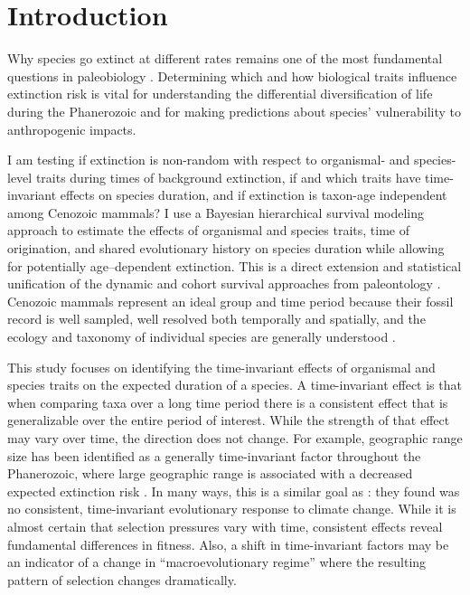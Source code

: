 \documentclass[12pt,letterpaper]{article}
\begin{document}
\section{Introduction}

Why species go extinct at different rates remains one of the most fundamental questions in paleobiology \citep{Simpson1944,VanValen1973,Raup1991b,Raup1994,Quental2013,Wagner2014b,Jablonski2005,Payne2007,Kitchell1986}. Determining which and how biological traits influence extinction risk is vital for understanding the differential diversification of life during the Phanerozoic and for making predictions about species' vulnerability to anthropogenic impacts. 

I am testing if extinction is non-random with respect to organismal- and species-level traits during times of background extinction, if and which traits have time-invariant effects on species duration, and if extinction is taxon-age independent among Cenozoic mammals? I use a Bayesian hierarchical survival modeling approach to estimate the effects of organismal and species traits, time of origination, and shared evolutionary history on species duration while allowing for potentially age--dependent extinction. This is a direct extension and statistical unification of the dynamic and cohort survival approaches from paleontology \citep{Simpson1944,VanValen1973,Foote1988,Raup1978,Raup1975,VanValen1979,Baumiller1993,Sepkoski1975}. Cenozoic mammals represent an ideal group and time period because their fossil record is well sampled, well resolved both temporally and spatially, and the ecology and taxonomy of individual species are generally understood \citep{Alroy2009,Alroy2000g,Jernvall2002,Liow2008,Smith2004,Quental2013,Alroy1996a,Alroy1998,Simpson1944,Blois2009,Tomiya2013,Marcot2014}. 

This study focuses on identifying the time-invariant effects of organismal and species traits on the expected duration of a species. A time-invariant effect is that when comparing taxa over a long time period there is a consistent effect that is generalizable over the entire period of interest. While the strength of that effect may vary over time, the direction does not change. For example, geographic range size has been identified as a generally time-invariant factor throughout the Phanerozoic, where large geographic range is associated with a decreased expected extinction risk \citep{Payne2007}. In many ways, this is a similar goal as \citet{Alroy2000g}: they found was no consistent, time-invariant evolutionary response to climate change. While it is almost certain that selection pressures vary with time, consistent effects reveal fundamental differences in fitness. Also, a shift in time-invariant factors may be an indicator of a change in ``macroevolutionary regime'' \citep{Jablonski1986} where the resulting pattern of selection changes dramatically.
\end{document}
